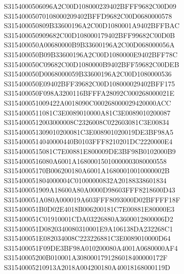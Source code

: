\documentclass[12pt,a4paper]{article}
\begin{document}
\begin{framed}
{S3154000506096A2C00D108000239402BFFF9682C00D09\newline
S31540005070108000209402BFFD9682C00D0680000578\newline
S315400050809B33600196A2C00D1080001A9402BFFBAC\newline
S315400050909682C00D108000179402BFF99682C00D0B\newline
S315400050A00680000B9B33600196A2C00D068000056A\newline
S315400050B09B33600196A2C00D1080000E9402BFF78C\newline
S315400050C09682C00D1080000B9402BFF59682C00DEB\newline
S315400050D0068000059B33600196A2C00D1080000536\newline
S315400050E09402BFF39682C00D108000029402BFF175\newline
S315400050F098A3200116BFFFA28092C000268000021E\newline
S315400051009422A0018090C000268000029420000ACC\newline
S3154000511081C3E0089010000A81C3E0089010200087\newline
S3154000512003000008C2326008C022603081C3E00834\newline
S315400051309010200081C3E008901020019DE3BF98A5\newline
S3154000514040000440B0103FFF8210201DC2220000E4\newline
S3154000515081C7E00881E800009DE3BF98B0102000B9\newline
S3154000516080A6001A16800015010000003080000558\newline
S31540005170B006200180A6001A16800010010000002B\newline
S315400051804000004C01000000832A20188338601834\newline
S315400051909A18600A80A0000D98603FFF8218600D43\newline
S315400051A080A000019A603FFF8093000D02BFFFF18F\newline
S315400051B0D02E4018B006200181C7E00881E80000E3\newline
S315400051C01910001CDA03226880A3600012800006D2\newline
S315400051D0820340080310001E9A106138DA232268C1\newline
S315400051E082034008C223226881C3E0089010000D64\newline
S315400051F09DE3BF98A010200080A4001A0680000AF4\newline
S31540005200B010001A3080001791286018400000172F\newline
S31540005210913A2018A004200180A40018168000119D\newline
}
\end{framed}
\end{document}
